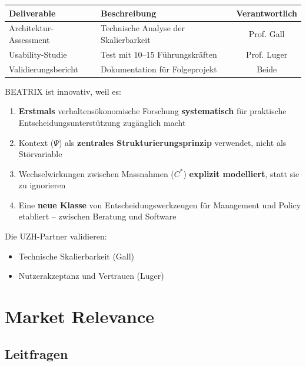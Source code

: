 \documentclass[11pt,a4paper]{article}
\begin{document}
\begin{table}[h]
\centering
\begin{tabularx}{\textwidth}{lXc}
\toprule
\textbf{Deliverable} & \textbf{Beschreibung} & \textbf{Verantwortlich} \\
\midrule
Architektur-Assessment & Technische Analyse der Skalierbarkeit & Prof. Gall \\
Usability-Studie & Test mit 10--15 Führungskräften & Prof. Luger \\
Validierungsbericht & Dokumentation für Folgeprojekt & Beide \\
\bottomrule
\end{tabularx}
\end{table}

\begin{summarybox}
BEATRIX ist innovativ, weil es:
\begin{enumerate}
    \item \textbf{Erstmals} verhaltensökonomische Forschung \textbf{systematisch} für praktische Entscheidungsunterstützung zugänglich macht
    \item Kontext ($\Psi$) als \textbf{zentrales Strukturierungsprinzip} verwendet, nicht als Störvariable
    \item Wechselwirkungen zwischen Massnahmen ($C^*$) \textbf{explizit modelliert}, statt sie zu ignorieren
    \item Eine \textbf{neue Klasse} von Entscheidungswerkzeugen für Management und Policy etabliert -- zwischen Beratung und Software
\end{enumerate}

Die UZH-Partner validieren:
\begin{itemize}
    \item Technische Skalierbarkeit (Gall)
    \item Nutzerakzeptanz und Vertrauen (Luger)
\end{itemize}
\end{summarybox}

\newpage

\section{Market Relevance}

\subsection{Leitfragen}
\end{document}
